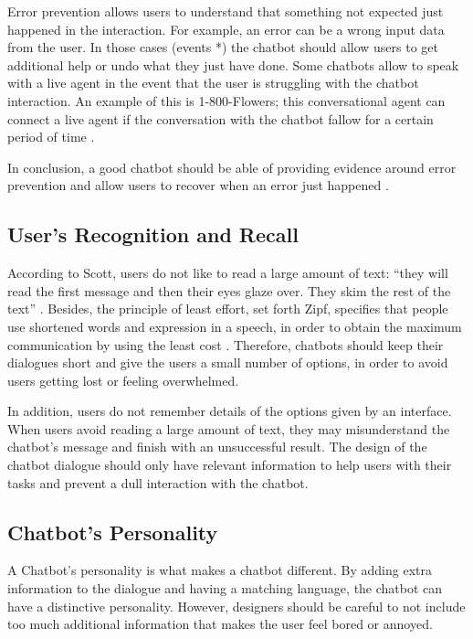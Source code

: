\documentclass[a4paper,10pt]{article}
\begin{document}
Error prevention allows users to understand that something not expected just happened in the interaction. For example, an error can be a wrong input data from the user. In those cases (events *) the chatbot should allow users to get additional help or undo what they just have done. Some chatbots  allow to speak with a live agent in the event that the user is struggling with the chatbot interaction. An example of this is 1-800-Flowers; this conversational agent can connect a live agent if the conversation with the chatbot fallow for a certain period of time \cite{1-800-Flowers}. 

In conclusion, a good chatbot should be able of providing evidence around error prevention and allow users to recover when an error just happened \cite{HeuristicsWebPage}. 

\subsection*{User's Recognition and Recall}

According to Scott, users do not like to read a large amount of text: ``they will read the first message and then their eyes glaze over. They skim the rest of the text” \cite{HeuristicsWebPage}. Besides, the principle of least effort, set forth Zipf, specifies that people use shortened words and expression in a speech, in order to obtain the maximum communication by using the least cost \cite{allen1978conversation}. Therefore, chatbots should keep their dialogues short and give the users a small number of options, in order to avoid users getting lost or feeling overwhelmed.

In addition, users do not remember details of the options given by an interface. When users avoid reading a large amount of text, they may misunderstand the chatbot’s message and finish with an unsuccessful result. The design of the chatbot dialogue should only have relevant information to help users with their tasks and prevent a dull interaction with the chatbot. 

\subsection*{Chatbot's Personality}

A Chatbot’s personality is what makes a chatbot different. By adding extra information to the dialogue and having a matching language, the chatbot can have a distinctive personality. However, designers should be careful to not include too much additional information that makes the user feel bored or annoyed. 
\end{document}
